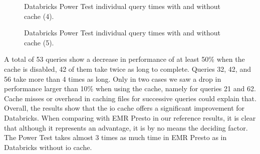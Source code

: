 \begin{figure}
   \begin{center}
   \end{center}
   \caption{Databricks Power Test individual query times with and without cache (4).}
   \label{fig:additionalResultsDatabricksNoCachePowerTestIndividualQueries4}
\end{figure}

\begin{figure}
   \begin{center}
   \end{center}
   \caption{Databricks Power Test individual query times with and without cache (5).}
   \label{fig:additionalResultsDatabricksNoCachePowerTestIndividualQueries5}
\end{figure}

A total of 53 queries show a decrease in performance of at least 50\% when the cache is disabled, 42 of them take twice as long to complete. Queries 32, 42, and 56 take more than 4 times as long. Only in two cases we saw a drop in performance larger than 10\% when using the cache, namely for queries 21 and 62. Cache misses or overhead in caching files for successive queries could explain that. Overall, the results show that the io cache offers a significant improvement for Databricks. When comparing with EMR Presto in our reference results, it is clear that although it represents an advantage, it is by no means the deciding factor. The Power Test takes almost 3 times as much time in EMR Presto as in Databricks without io cache.

